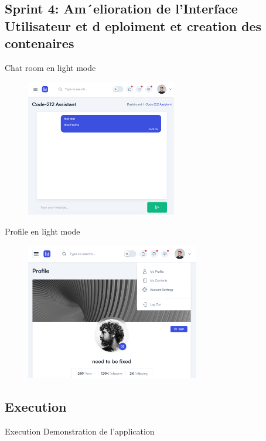 \documentclass[aspectratio=169]{beamer}
\begin{document}
\subsection{Sprint 4: Am´elioration de l’Interface Utilisateur et d eploiment et creation des
    contenaires}

\begin{frame}{Chat room en light mode}
    \begin{figure}[htpb]
        \centering
        \includegraphics[height=6cm]{assets/images/light-chat.png}
    \end{figure}
\end{frame}

\begin{frame}{Profile en light mode}
    \begin{figure}[htpb]
        \centering
        \includegraphics[height=6cm]{assets/images/light-profile.png}
    \end{figure}
\end{frame}

\subsection{Execution}
\begin{frame}{Execution}
    Demonstration de l'application
\end{frame}
\end{document}
